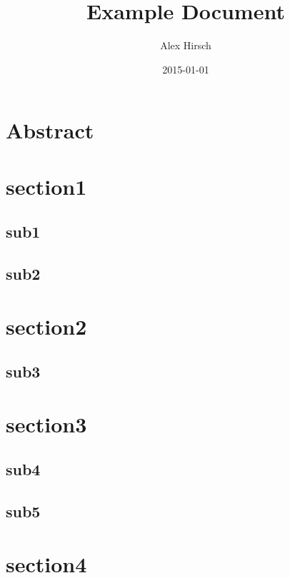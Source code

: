 \documentclass[report]{uibk}
\title{Example Document}
\author{Alex Hirsch}
\date{2015-01-01}
\begin{document}
\maketitle

\chapter*{Abstract}
\label{ch:abstract}

\lipsum[1]

\tableofcontents

\chapter{section1}
\label{ch:section1}

\lipsum[1]

\section{sub1}
\label{sec:sub1}

\lipsum[1-3]

\section{sub2}
\label{sec:sub2}

\lipsum[1-3]

\chapter{section2}
\label{ch:section2}

\lipsum[1]

\section{sub3}
\label{sec:sub3}

\lipsum[1-5]

\chapter{section3}
\label{ch:section3}

\lipsum[1]

\section{sub4}
\label{sec:sub4}

\lipsum[1-2]

\section{sub5}
\label{sec:sub5}

\lipsum[1-2]

\chapter{section4}
\label{ch:section4}

\lipsum[1-3]
\end{document}
